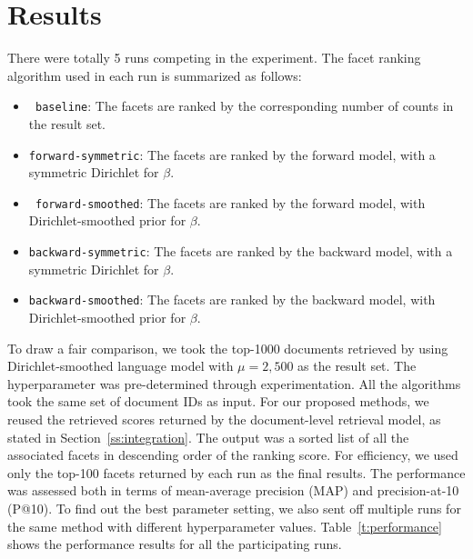\section{Results}\label{s:results}


There were totally 5 runs competing in the experiment.  The facet ranking
algorithm used in each run is summarized as follows: \begin{itemize} \item {\tt
baseline}:  The facets are ranked by the corresponding number of counts in the
result set.  \item {\tt forward-symmetric}:  The facets are ranked by the
forward model, with a symmetric Dirichlet for $\beta$.  \item {\tt
forward-smoothed}:  The facets are ranked by the forward model, with
Dirichlet-smoothed prior for $\beta$.  \item {\tt backward-symmetric}:  The
facets are ranked by the backward model, with a symmetric Dirichlet for
$\beta$.  \item {\tt backward-smoothed}:  The facets are ranked by the backward
model, with Dirichlet-smoothed prior for $\beta$.  \end{itemize}

To draw a fair comparison, we took the top-1000 documents retrieved by using
Dirichlet-smoothed language model with $\mu = 2,500$ as the result set.  The
hyperparameter was pre-determined through experimentation.  All the algorithms took the
same set of document IDs as input.  For our proposed methods, we reused
the retrieved scores returned by the document-level retrieval model, as
stated in Section~\ref{ss:integration}.  The output was a sorted list of all the
associated facets in descending order of the ranking score.  For efficiency, we
used only the top-100 facets returned by each run as the final results.  The
performance was assessed both in terms of mean-average precision (MAP) and
precision-at-10 (P@10).  To find out the best parameter setting, we also sent off multiple
runs for the same method with different hyperparameter values.
Table~\ref{t:performance} shows the performance results for all the
participating runs.

